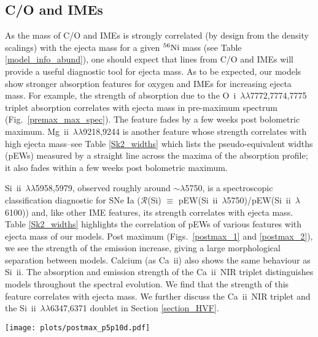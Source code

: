 \documentclass[useAMS,usenatbib,useasmath]{mnras}
\newcommand{\elem}[2][default]{$^{#1}{\rm #2}$}
\newcommand{\caii}{\mbox{Ca~{\sc ii}}}
\newcommand{\oi}{\mbox{O~{\sc i}}}
\newcommand{\skii}{\mbox{Si~{\sc ii}}}
\newcommand{\mgii}{\mbox{Mg~{\sc ii}}}
\newcommand{\lb}{$\lambda$}
\def\fig{Fig.}
\def\figs{Figs.}
\begin{document}
\subsection{C/O and IMEs}
As the mass of C/O and IMEs is strongly correlated (by design from the density scalings) with the ejecta mass for a given \elem[56]{Ni} mass (see Table \ref{model_info_abund}), one should expect that lines from C/O and IMEs will provide a useful diagnostic tool for ejecta mass. As to be expected, our models show stronger absorption features for oxygen and IMEs for increasing ejecta mass. For example, the strength of absorption due to the \oi\ \lb\lb7772,7774,7775 triplet absorption correlates with ejecta mass in pre-maximum spectrum (\fig~\ref{premax_max_spec}). 
The feature fades by a few weeks post bolometric maximum. \mgii\ \lb\lb9218,9244 is another feature whose strength correlates with  high ejecta mass--see Table \ref{Sk2_widths} which lists the pseudo-equivalent widths (pEWs) measured by a straight line across the maxima of the absorption profile; it also  fades within a few weeks post bolometric maximum.

\skii\ \lb\lb5958,5979, observed roughly around $\sim$\lb5750, is a spectroscopic classification diagnostic for SNe Ia ($\mathcal{R}$(Si) $\equiv$ pEW(\skii\ \lb5750)/pEW(\skii\ \lb6100)) and, like other IME features, its strength correlates with ejecta mass. Table \ref{Sk2_widths} highlights the correlation of pEWs of various features with ejecta mass of our models. Post maximum (\figs~\ref{postmax_1} and \ref{postmax_2}), we see the strength of the emission increase, giving a large morphological separation between models. Calcium (as \caii) also shows the same behaviour as \skii. The absorption and emission strength of the \caii\ NIR triplet distinguishes models throughout the spectral evolution. We find that the strength of this feature correlates with ejecta mass. We further discuss the \caii\ NIR triplet and the \skii\ \lb\lb6347,6371 doublet in Section \ref{section_HVF}. 

\begin{figure*} 
\begin{minipage}[t]{\linewidth}
\centering
\texttt{[image: plots/postmax\_p5p10d.pdf]}
\end{minipage}
\caption{Spectral comparisons between models in the post-maximum phases ($+5$ and $+10$ days) relative to bolometric maximum plotted in $\lambda F_\lambda$ vs \lb\ space in order to contrast the NIR tail of the spectrum. In each plot, all models have been scaled by the same value, and we have added a multiple of the offset to more easily distinguish the models. The optical spectra is again similar showing still the strong \skii\ doublet at $\sim$6100 \AA. The UV spectrum shows stronger blanketing in higher mass models. The strength of the \caii\ NIR triplet deviates between the models, showing stronger absorption/emission in the cooler (higher mass) models.}
\label{postmax_1}
\end{figure*}
\end{document}
